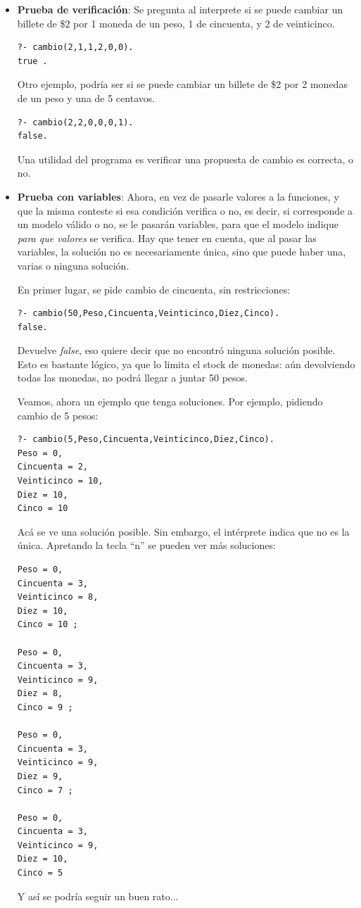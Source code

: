 \documentclass[12pt,titlepage]{article}
\begin{document}
\begin{itemize}
 \item \textbf{Prueba de verificación}: Se pregunta al interprete si se puede cambiar un billete de \$2 por 1 moneda de un peso, 1 de cincuenta, y 2 de veinticinco.

\begin{lstlisting}
?- cambio(2,1,1,2,0,0).
true . 
\end{lstlisting}

Otro ejemplo, podría ser si se puede cambiar un billete de \$2 por 2 monedas de un peso y una de 5 centavos.
\begin{lstlisting}
?- cambio(2,2,0,0,0,1).
false.
\end{lstlisting}

Una utilidad del programa es verificar una propuesta de cambio es correcta, o no.

 \item \textbf{Prueba con variables}: Ahora, en vez de pasarle valores a la funciones, y que la misma conteste si esa condición verifica o no, es decir, si corresponde a un modelo válido o no, se le pasarán variables, para que el modelo indique \textit{para que valores} se verifica. Hay que tener en cuenta, que al pasar las variables, la solución no es necesariamente única, sino que puede haber una, varias o ninguna solución.

En primer lugar, se pide cambio de cincuenta, sin restricciones:
\begin{lstlisting}
?- cambio(50,Peso,Cincuenta,Veinticinco,Diez,Cinco).
false.
\end{lstlisting}
Devuelve \textit{false}, eso quiere decir que no encontró ninguna solución posible. Esto es bastante lógico, ya que lo limita el stock de monedas: aún devolviendo todas las monedas, no podrá llegar a juntar 50 pesos.

Veamos, ahora un ejemplo que tenga soluciones. Por ejemplo, pidiendo cambio de 5 pesos:
\begin{lstlisting}
?- cambio(5,Peso,Cincuenta,Veinticinco,Diez,Cinco).
Peso = 0,
Cincuenta = 2,
Veinticinco = 10,
Diez = 10,
Cinco = 10 
\end{lstlisting}
Acá se ve una solución posible. Sin embargo, el intérprete indica que no es la única. Apretando la tecla ``n'' se pueden ver más soluciones:
\begin{lstlisting}
Peso = 0,
Cincuenta = 3,
Veinticinco = 8,
Diez = 10,
Cinco = 10 ;

Peso = 0,
Cincuenta = 3,
Veinticinco = 9,
Diez = 8,
Cinco = 9 ;

Peso = 0,
Cincuenta = 3,
Veinticinco = 9,
Diez = 9,
Cinco = 7 ;

Peso = 0,
Cincuenta = 3,
Veinticinco = 9,
Diez = 10,
Cinco = 5 
\end{lstlisting}

Y así se podría seguir un buen rato...

\end{itemize}
\end{document}

